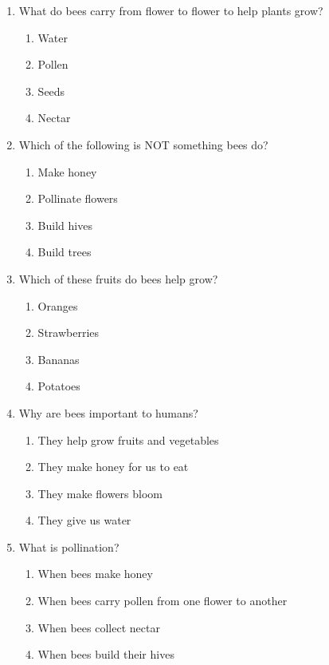 \documentclass[12pt]{article}
\begin{document}
\begin{enumerate}
    \item What do bees carry from flower to flower to help plants grow?  
    \begin{enumerate}[label=\Alph*.]
        \item Water  
        \item Pollen  
        \item Seeds  
        \item Nectar
    \end{enumerate}
    \vspace{0.5cm}

    \item Which of the following is NOT something bees do?  
    \begin{enumerate}[label=\Alph*.]
        \item Make honey  
        \item Pollinate flowers  
        \item Build hives  
        \item Build trees
    \end{enumerate}
    \vspace{0.5cm}

    \item Which of these fruits do bees help grow?  
    \begin{enumerate}[label=\Alph*.]
        \item Oranges  
        \item Strawberries  
        \item Bananas  
        \item Potatoes
    \end{enumerate}
    \vspace{0.5cm}

    \item Why are bees important to humans?  
    \begin{enumerate}[label=\Alph*.]
        \item They help grow fruits and vegetables  
        \item They make honey for us to eat  
        \item They make flowers bloom  
        \item They give us water
    \end{enumerate}
    \vspace{0.5cm}

    \item What is pollination?  
    \begin{enumerate}[label=\Alph*.]
        \item When bees make honey  
        \item When bees carry pollen from one flower to another  
        \item When bees collect nectar  
        \item When bees build their hives
    \end{enumerate}
    \vspace{0.5cm}


\end{enumerate}
\end{document}
